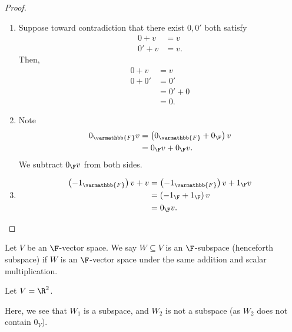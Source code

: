 \documentclass[12pt]{mypackage}
\renewcommand*{\mathbb}[1]{\varmathbb{#1}}
\begin{document}
\begin{proof}\hfill
  \begin{enumerate}[(1)]
    \item Suppose toward contradiction that there exist $0,0'$ both satisfy 
      \begin{align*}
        0 + v &= v\tag*{(\textasteriskcentered)}\\
        0' + v &= v.\tag*{(\textasteriskcentered\textasteriskcentered)}
      \end{align*}
      Then,
      \begin{align*}
        0 + v &= v\\
        0 + 0' &= 0'\tag*{by (\textasteriskcentered) with $v = 0'$}\\
               &= 0' + 0\\
               &= 0. \tag*{by (\textasteriskcentered\textasteriskcentered) with $v = 0$}
      \end{align*}
    \item Note
      \begin{align*}
        0_{\mathbb{F}}v &= \left(0_{\mathbb{F}} + 0_{\F}\right) v\\
                        &= 0_{\F}v + 0_{\F}v.
      \end{align*}
      We subtract $0_{\F}v$ from both sides.
    \item
      \begin{align*}
        \left(-1_{\mathbb{F}}\right)v + v &= \left(-1_{\mathbb{F}} \right)v + 1_{\F}v\\
                                          &= \left(-1_{\F} + 1_{\F}\right)v\\
                                          &= 0_{\F}v.
      \end{align*}
  \end{enumerate}
\end{proof}
\begin{definition}[Subspaces]
  Let $V$ be an $\F$-vector space. We say $W\subseteq V$ is an $\F$-subspace (henceforth subspace) if $W$ is an $\F$-vector space under the same addition and scalar multiplication.
\end{definition}
\begin{example}[Subspaces of $\R^2$]
  Let $V = \R^2$. 
  \begin{center}
  \end{center}
  Here, we see that $W_1$ is a subspace, and $W_2$ is not a subspace (as $W_2$ does not contain $0_{V}$).
\end{example}
\end{document}

